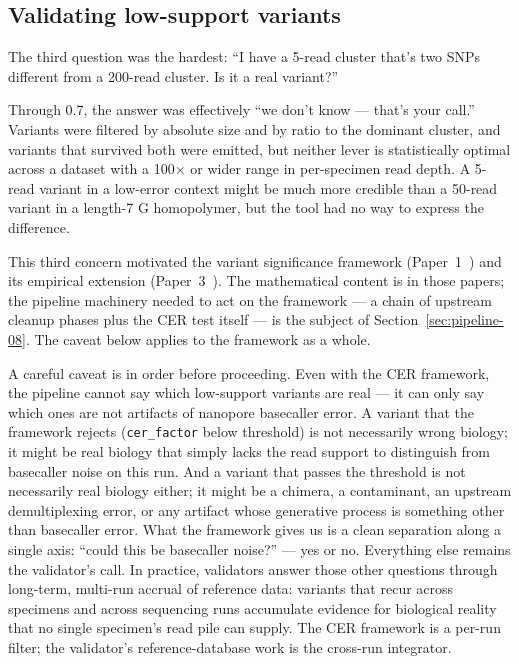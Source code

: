 \documentclass[11pt]{article}
\begin{document}
\subsection{Validating low-support variants}

The third question was the hardest: ``I have a 5-read cluster that's two SNPs
different from a 200-read cluster. Is it a real variant?''

Through 0.7, the answer was effectively ``we don't know --- that's your call.''
Variants were filtered by absolute size and by ratio to the dominant cluster,
and variants that survived both were emitted, but neither lever is
statistically optimal across a dataset with a 100$\times$ or wider range in
per-specimen read depth. A 5-read variant in a low-error context might be much
more credible than a 50-read variant in a length-7 G homopolymer, but the tool
had no way to express the difference.

This third concern motivated the variant significance framework
(Paper~1~\cite{cer_paper}) and its empirical extension
(Paper~3~\cite{cer_in_practice}). The mathematical content is in those
papers; the pipeline machinery needed to act on the framework --- a
chain of upstream cleanup phases plus the CER test itself --- is the
subject of Section~\ref{sec:pipeline-08}. The caveat below applies to
the framework as a whole.

A careful caveat is in order before proceeding. Even with the CER framework,
the pipeline cannot say which low-support variants are real --- it can only
say which ones are not artifacts of nanopore basecaller error. A variant
that the framework rejects (\texttt{cer\_factor} below threshold) is not
necessarily wrong biology; it might be real biology that simply lacks the
read support to distinguish from basecaller noise on this run. And a variant
that passes the threshold is not necessarily real biology either; it might
be a chimera, a contaminant, an upstream demultiplexing error, or any
artifact whose generative process is something other than basecaller error.
What the framework gives us is a clean separation along a single axis:
``could this be basecaller noise?'' --- yes or no. Everything else remains
the validator's call. In practice, validators answer those other
questions through long-term, multi-run accrual of reference data:
variants that recur across specimens and across sequencing runs
accumulate evidence for biological reality that no single specimen's
read pile can supply. The CER framework is a per-run filter; the
validator's reference-database work is the cross-run integrator.
\end{document}

